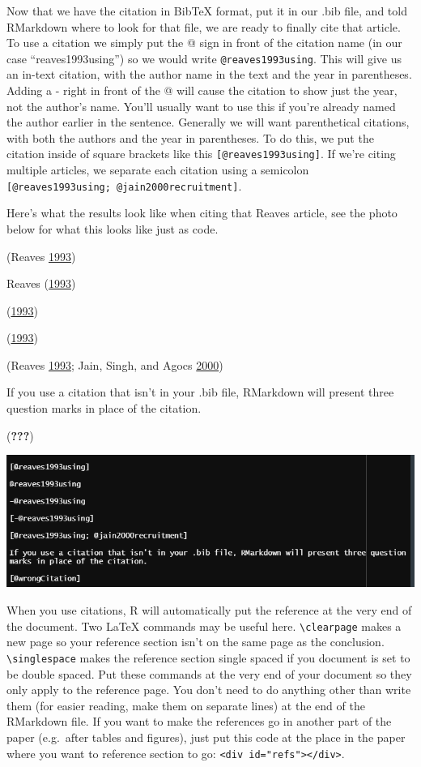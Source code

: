 \documentclass[
  12pt,
]{book}
\begin{document}
Now that we have the citation in BibTeX format, put it in our .bib file, and told RMarkdown where to look for that file, we are ready to finally cite that article. To use a citation we simply put the @ sign in front of the citation name (in our case ``reaves1993using'') so we would write \texttt{@reaves1993using}. This will give us an in-text citation, with the author name in the text and the year in parentheses. Adding a - right in front of the @ will cause the citation to show just the year, not the author's name. You'll usually want to use this if you're already named the author earlier in the sentence. Generally we will want parenthetical citations, with both the authors and the year in parentheses. To do this, we put the citation inside of square brackets like this \texttt{{[}@reaves1993using{]}}. If we're citing multiple articles, we separate each citation using a semicolon \texttt{{[}@reaves1993using;\ @jain2000recruitment{]}}.

Here's what the results look like when citing that Reaves article, see the photo below for what this looks like just as code.

(Reaves \protect\hyperlink{ref-reaves1993using}{1993})

Reaves (\protect\hyperlink{ref-reaves1993using}{1993})

(\protect\hyperlink{ref-reaves1993using}{1993})

(\protect\hyperlink{ref-reaves1993using}{1993})

(Reaves \protect\hyperlink{ref-reaves1993using}{1993}; Jain, Singh, and Agocs \protect\hyperlink{ref-jain2000recruitment}{2000})

If you use a citation that isn't in your .bib file, RMarkdown will present three question marks in place of the citation.

({\textbf{???}})

\includegraphics{images/citation_raw.PNG}

When you use citations, R will automatically put the reference at the very end of the document. Two LaTeX commands may be useful here. \texttt{\textbackslash{}clearpage} makes a new page so your reference section isn't on the same page as the conclusion. \texttt{\textbackslash{}singlespace} makes the reference section single spaced if you document is set to be double spaced. Put these commands at the very end of your document so they only apply to the reference page. You don't need to do anything other than write them (for easier reading, make them on separate lines) at the end of the RMarkdown file. If you want to make the references go in another part of the paper (e.g.~after tables and figures), just put this code at the place in the paper where you want to reference section to go: \texttt{\textless{}div\ id="refs"\textgreater{}\textless{}/div\textgreater{}}.
\end{document}
